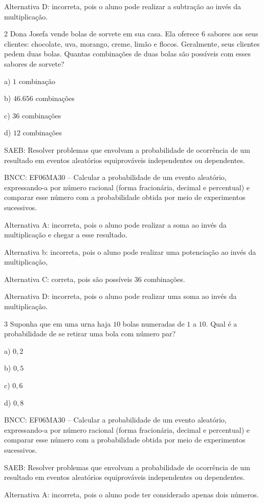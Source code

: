 Alternativa D: incorreta, pois o aluno pode realizar a subtração ao
invés da multiplicação.

\num{2}  Dona Josefa vende bolas de sorvete em sua casa. Ela oferece $6$ sabores
aos seus clientes: chocolate, uva, morango, creme, limão e flocos.
Geralmente, seus clientes pedem duas bolas. Quantas combinações de duas
bolas são possíveis com esses sabores de sorvete?

a) $1$ combinação

b) $46.656$ combinações

c) $36$ combinações

d) $12$ combinações

SAEB: Resolver problemas que envolvam a probabilidade de ocorrência de
um resultado em eventos aleatórios equiprováveis independentes ou
dependentes.

BNCC: EF06MA30 -- Calcular a probabilidade de um evento aleatório,
expressando-a por número racional (forma fracionária, decimal e
percentual) e comparar esse número com a probabilidade obtida por meio
de experimentos sucessivos.

Alternativa A: incorreta, pois o aluno pode realizar a soma ao invés da
multiplicação e chegar a esse resultado.

Alternativa b: incorreta, pois o aluno pode realizar uma potenciação ao
invés da multiplicação,

Alternativa C: correta, pois são possíveis $36$ combinações.

Alternativa D: incorreta, pois o aluno pode realizar uma soma ao invés
da multiplicação.

\num{3}  Suponha que em uma urna haja $10$ bolas numeradas de $1$ a $10$. Qual é a
probabilidade de se retirar uma bola com número par?

a) $0,2$

b) $0,5$

c) $0,6$

d) $0,8$

BNCC: EF06MA30 -- Calcular a probabilidade de um evento aleatório,
expressando-a por número racional (forma fracionária, decimal e
percentual) e comparar esse número com a probabilidade obtida por meio
de experimentos sucessivos.

SAEB: Resolver problemas que envolvam a probabilidade de ocorrência de
um resultado em eventos aleatórios equiprováveis independentes ou
dependentes.

Alternativa A: incorreta, pois o aluno pode ter considerado apenas dois
números.

